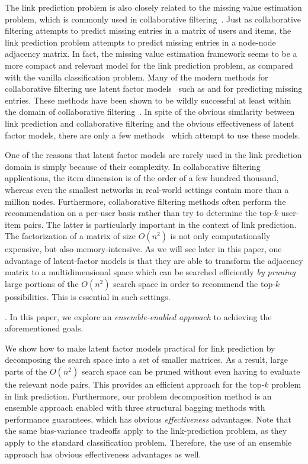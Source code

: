 The link prediction problem is also closely related to the missing value
estimation problem, which is commonly used in collaborative
filtering~\cite{adom}.  Just as collaborative filtering attempts to
predict missing entries in a matrix of users and items, the link
prediction problem attempts to predict missing entries in a
node-node adjacency matrix. In fact, the missing value estimation
framework seems to be a more compact and relevant model for the link
prediction problem, as compared with the vanilla classification
problem.  Many of the modern methods for collaborative filtering use
latent factor models~\cite{conceptualr,web} such as \SVD and
\NMF for predicting missing entries. These methods have been
shown to be wildly successful at least within the domain of
collaborative filtering~\cite{web}. In spite of the obvious
similarity between link prediction and collaborative filtering and
the obvious effectiveness of latent factor models, there are only a
few methods~\cite{menon} which attempt to use these models.

One of the reasons that latent factor models are rarely used in the
link prediction domain is simply because of their complexity. In
collaborative filtering applications, the item dimension is of the
order of a few hundred thousand, whereas even the smallest networks
in real-world settings contain more than a million nodes.
Furthermore, collaborative filtering methods  often perform the
recommendation on a per-user basis rather than try to determine
the top-$k$ user-item pairs.  The latter is particularly important
in the context of link prediction. The factorization of a matrix of
size $O(n^2)$ is not only computationally expensive, but also
memory-intensive.  As we will see later in this paper, one advantage
of  latent-factor models is that they are able to  transform the
adjacency matrix to a multidimensional space which can be searched
efficiently {\em by pruning} large portions of the $O(n^2)$ search
space in order to recommend the top-$k$ possibilities. This is
essential in such settings.

. In this paper, we explore an {\em ensemble-enabled approach} to
achieving the aforementioned goals.

We show how to make latent factor models
practical for link prediction by decomposing the search space into a
 set of smaller matrices. As a result, large parts of the $O(n^2)$
search space can be pruned without even having to evaluate the
relevant node pairs. This provides an efficient approach for the
top-$k$ problem in link prediction.  Furthermore, our problem
decomposition method is an ensemble approach enabled with three structural bagging methods with performance guarantees, which has obvious {\em
effectiveness} advantages. Note that the same bias-variance
tradeoffs apply to the link-prediction problem, as they apply to the
standard classification problem. Therefore, the use of an ensemble
approach has obvious effectiveness advantages as well.

